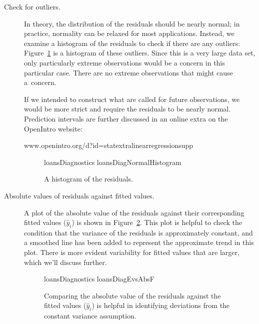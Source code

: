 \begin{description}
\item[Check for outliers.]
    In theory, the distribution of the residuals should
    be nearly normal;
    in practice, normality can be relaxed for most applications.
    Instead, we examine a histogram of the residuals
    to check if there are any outliers:
    Figure~\ref{loansDiagNormalHistogram}
    is a histogram of these outliers.
    Since this is a very large data set,
    only particularly extreme observations would be a concern
    in this particular case.
    There are no extreme observations that might cause a~concern.

    If we intended to construct what are called
    for future observations,
    we would be more strict and
    require the residuals to be nearly normal.
    Prediction intervals are further discussed in
    an online extra on the OpenIntro website:\vspace{-2mm}
    \begin{center}
          {www.openintro.org/d?id=stat\us{}extra\us{}linear\us{}regression\us{}supp}
    \end{center}

\begin{figure}[h]
  \centering
      {loansDiagnostics}
      {loansDiagNormalHistogram}
  \caption{A histogram of the residuals.}
  \label{loansDiagNormalHistogram}
\end{figure}

\item[Absolute values of residuals against fitted values.]
    A plot of the absolute value of the residuals against
    their corresponding fitted values ($\hat{y}_i$) is shown
    in Figure~\ref{loansDiagEvsAbsF}.
    This plot is helpful to check the condition that the
    variance of the residuals is approximately constant,
    and a smoothed line has been added to represent the
    approximate trend in this plot.
    There is more evident variability for fitted values that are
    larger, which we'll discuss further.

\begin{figure}
  \centering
      {loansDiagnostics}
      {loansDiagEvsAbsF}
  \caption{Comparing the absolute value of the residuals against the fitted values ($\hat{y}_i$) is helpful in identifying deviations from the constant variance assumption.}
  \label{loansDiagEvsAbsF}
\end{figure}


\end{description}
